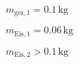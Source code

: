 \( m_{\text{ges},1} = 0.1 \, \text{kg} \)  

\( m_{\text{Eis},1} = 0.06 \, \text{kg} \)  

\( m_{\text{Eis},2} > 0.1 \, \text{kg} \)
